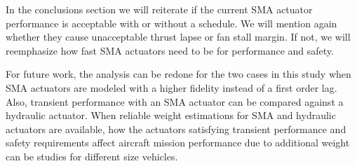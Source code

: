 
In the conclusions section we will reiterate if the current SMA actuator performance is acceptable with or without a schedule. We will mention again whether they cause unacceptable thrust lapse or fan stall margin. If not, we will reemphasize how fast SMA actuators need to be for performance and safety.

For future work, the analysis can be redone for the two cases in this study when SMA actuators are modeled with a higher fidelity instead of a first order lag. Also, transient performance with an SMA actuator can be compared against a hydraulic actuator. When reliable weight estimations for SMA and hydraulic actuators are available, how the actuators satisfying transient performance and safety requirements affect aircraft mission performance due to additional weight can be studies for different size vehicles.